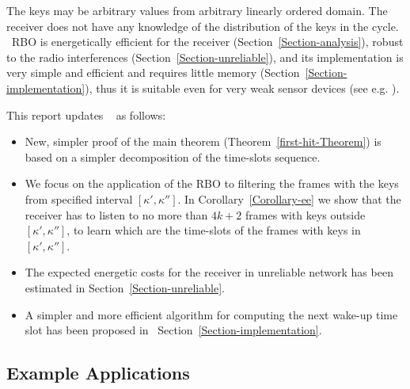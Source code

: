 \documentclass{article}
\newenvironment{itemizedot}{\begin{itemize} \renewcommand{\labelitemi}{$\bullet$}\renewcommand{\labelitemii}{$\bullet$}\renewcommand{\labelitemiii}{$\bullet$}\renewcommand{\labelitemiv}{$\bullet$}}{\end{itemize}}
\begin{document}
The keys may be arbitrary values from arbitrary linearly ordered domain.
The receiver does not have any knowledge of the distribution of the keys in
the cycle. \ RBO is energetically efficient for the receiver
(Section~\ref{Section-analysis}), robust to the radio interferences
(Section~\ref{Section-unreliable}), and its implementation is very simple and
efficient and requires little memory (Section~\ref{Section-implementation}),
thus it is suitable even for very weak sensor devices (see e.g.
{\cite{TinyOSProgramming}}).

This report updates \ {\cite{DBLP:journals/corr/abs-1108-5095}} as follows:
\begin{itemizedot}
  \item New, simpler  proof of the main theorem (Theorem~\ref{first-hit-Theorem}) is
  based on a simpler decomposition of the time-slots sequence.
  
  \item We focus on the application of the RBO to  filtering the frames with
  the keys from specified interval $[\kappa', \kappa'']$. In
  Corollary~\ref{Corollary-ee} we show that the receiver has to listen to no
  more than $4 k + 2$ frames with keys outside $[\kappa', \kappa'']$, to learn
  which are the time-slots of the frames with keys in $ [\kappa', \kappa'']$.
  
  \item The expected energetic costs for the receiver in unreliable network
  has been estimated in Section~\ref{Section-unreliable}.
  
  \item A simpler and more efficient algorithm for computing the next wake-up
  time slot has been proposed in \ Section~\ref{Section-implementation}.
\end{itemizedot}


\subsection{Example Applications}
\end{document}

